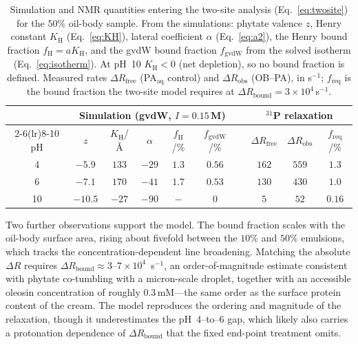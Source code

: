 \documentclass[11pt]{article}
\begin{document}
\begin{table}[h]
\centering
\begin{tabular}{@{}c ccccc c ccc@{}}
\toprule
 & \multicolumn{5}{c}{Simulation (gvdW, $I=0.15$\,M)} & &
   \multicolumn{3}{c}{$^{31}$P relaxation} \\
\cmidrule(lr){2-6}\cmidrule(lr){8-10}
pH & $z$ & $K_\text{H}$/\AA & $\alpha$ & $f_\text{H}$/\% & $f_\text{gvdW}$/\% & &
 $\Delta R_\text{free}$ & $\Delta R_\text{obs}$ & $f_\text{req}$/\% \\
\midrule
4  & $-5.9$  & $133$ & $-29$ & $1.3$ & $0.56$ & & $162$ & $559$ & $1.3$  \\
6  & $-7.1$  & $170$ & $-41$ & $1.7$ & $0.53$ & & $130$ & $430$ & $1.0$  \\
10 & $-10.5$ & $-27$ & $-90$ & $-$   & $0$    & & $5$   & $52$  & $0.16$ \\
\bottomrule
\end{tabular}
\caption{Simulation and NMR quantities entering the two-site analysis
  (Eq.~\ref{eq:twosite}) for the $50\%$ oil-body sample.  From the simulations:
  phytate valence $z$, Henry constant $K_\text{H}$ (Eq.~\ref{eq:KH}), lateral
  coefficient $\alpha$ (Eq.~\ref{eq:a2}), the Henry bound fraction
  $f_\text{H}=aK_\text{H}$, and the gvdW bound fraction $f_\text{gvdW}$ from the
  solved isotherm (Eq.~\ref{eq:isotherm}).  At pH~10 $K_\text{H}<0$ (net
  depletion), so no bound fraction is defined.  Measured rates
  $\Delta R_\text{free}$ (PA$_\text{aq}$ control) and $\Delta R_\text{obs}$
  (OB--PA), in s$^{-1}$; $f_\text{req}$ is the bound fraction the two-site model
  requires at $\Delta R_\text{bound}=3\times10^{4}$\,s$^{-1}$.}
\label{tab:gvdw}
\end{table}

Two further observations support the model.  The bound fraction scales with the
oil-body surface area, rising about fivefold between the $10\%$ and $50\%$
emulsions, which tracks the concentration-dependent line broadening.  Matching
the absolute $\Delta R$ requires $\Delta R_\text{bound}\approx3$--$7\times10^{4}$
\,s$^{-1}$, an order-of-magnitude estimate consistent with phytate co-tumbling
with a micron-scale droplet, together with an accessible oleosin concentration
of roughly $0.3$\,mM---the same order as the surface protein content of the
cream.  The model reproduces the ordering
and magnitude of the relaxation, though it underestimates the pH~4--to--6 gap,
which likely also carries a protonation dependence of $\Delta R_\text{bound}$
that the fixed end-point treatment omits.
\end{document}
